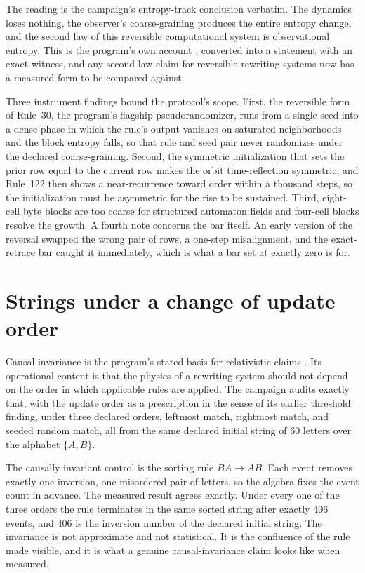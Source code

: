 \documentclass[aps,pre,reprint,nofootinbib]{revtex4-2}
\begin{document}
The reading is the campaign's entropy-track conclusion verbatim.  The
dynamics loses nothing, the observer's coarse-graining produces the
entire entropy change, and the second law of this reversible
computational system is observational entropy.  This is the program's
own account
\cite{Wolfram2023}, converted into a statement with an exact witness,
and any second-law claim for reversible rewriting systems now has a
measured form to be compared against.

Three instrument findings bound the protocol's scope.  First, the reversible form
of Rule~30, the program's flagship pseudorandomizer, runs from a
single seed into a dense phase in which the rule's output vanishes on
saturated neighborhoods and the block entropy falls, so that rule and
seed pair never randomizes under the declared coarse-graining.
Second, the symmetric initialization that sets the prior row equal to
the current row makes the orbit time-reflection symmetric, and
Rule~122 then shows a near-recurrence toward order within a thousand
steps, so the initialization must be asymmetric for the rise to be
sustained.  Third, eight-cell byte blocks are too coarse for
structured automaton fields and four-cell blocks resolve the growth.
A fourth note concerns the bar itself.  An early version of the
reversal swapped the wrong pair of rows, a one-step misalignment, and
the exact-retrace bar caught it immediately, which is what a bar set
at exactly zero is for.

\section{Strings under a change of update order}
\label{sec:wm2}

Causal invariance is the program's stated basis for relativistic
claims \cite{Gorard2020a}.  Its operational content is that the
physics of a rewriting system should not depend on the order in which
applicable rules are applied.  The campaign audits exactly that, with
the update order as a prescription in the sense of its earlier
threshold finding, under three declared orders, leftmost match,
rightmost match, and seeded random match, all from the same declared
initial string of $60$ letters over the alphabet $\{A,B\}$.

The causally invariant control is the sorting rule $BA \to AB$.  Each
event removes exactly one inversion, one misordered pair of letters,
so the algebra fixes the event
count in advance.  The measured result agrees exactly.  Under every
one of the three orders the rule terminates in the same sorted string
after exactly $406$ events, and $406$ is the inversion number of the
declared initial string.  The invariance is not approximate and not
statistical.  It is the confluence of the rule made visible, and it is
what a genuine causal-invariance claim looks like when measured.
\end{document}
